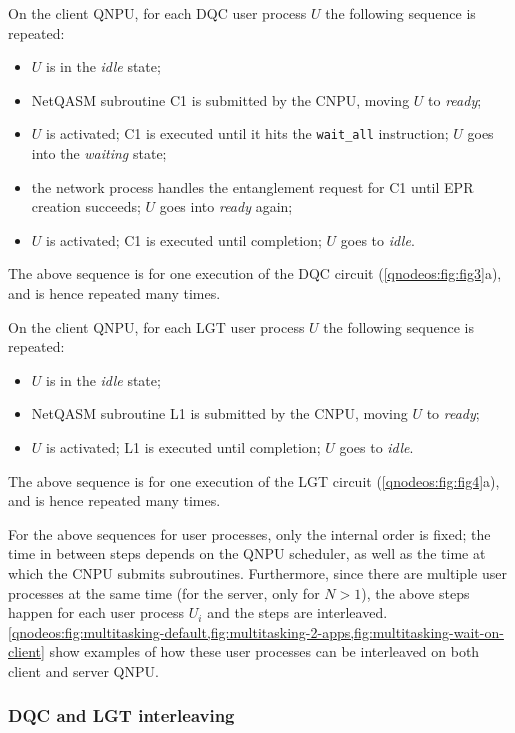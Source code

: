 On the client \ac{QNPU}, for each \ac{DQC} user process $U$ the following sequence is repeated:
%
\begin{itemize}
    \item $U$ is in the \textit{idle} state;
    \item \ac{NetQASM} subroutine C1 is submitted by the \ac{CNPU}, moving $U$ to \textit{ready};
    \item $U$ is activated; C1 is executed until it hits the \texttt{wait\_all} instruction; $U$ goes into the \textit{waiting} state;
    \item the network process handles the entanglement request for C1 until \ac{EPR} creation succeeds; $U$ goes into \textit{ready} again;
    \item $U$ is activated; C1 is executed until completion; $U$ goes to \textit{idle}.
\end{itemize}
%
The above sequence is for one execution of the \ac{DQC} circuit (\cref{qnodeos:fig:fig3}a), and is hence repeated many times.

On the client \ac{QNPU}, for each \ac{LGT} user process $U$ the following sequence is repeated:
%
\begin{itemize}
    \item $U$ is in the \textit{idle} state;
    \item \ac{NetQASM} subroutine L1 is submitted by the \ac{CNPU}, moving $U$ to \textit{ready};
    \item $U$ is activated; L1 is executed until completion; $U$ goes to \textit{idle}.
\end{itemize}
%
The above sequence is for one execution of the \ac{LGT} circuit (\cref{qnodeos:fig:fig4}a), and is hence repeated many times.

For the above sequences for user processes, only the internal order is fixed; the time in between steps depends on the \ac{QNPU} scheduler, as well as the time at which the \ac{CNPU} submits subroutines. Furthermore, since there are multiple user processes at the same time (for the server, only for $N > 1$), the above steps happen for each user process $U_i$ and the steps are interleaved. \cref{qnodeos:fig:multitasking-default,fig:multitasking-2-apps,fig:multitasking-wait-on-client} show examples of how these user processes can be interleaved on both client and server \ac{QNPU}.

\subsubsection{DQC and LGT interleaving}

